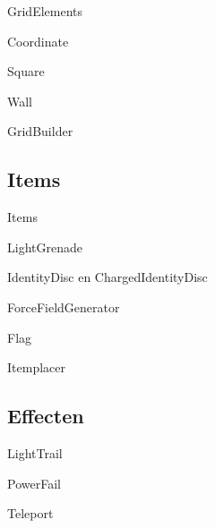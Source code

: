 \documentclass[11pt,t]{beamer}
\begin{document}
\begin{frame}{GridElements}
\end{frame}

\begin{frame}{Coordinate}
\end{frame}

\begin{frame}{Square}
\end{frame}

\begin{frame}{Wall}
\end{frame}

\begin{frame}{GridBuilder}
\end{frame}

\subsection{Items}

\begin{frame}{Items}
\end{frame}

\begin{frame}{LightGrenade}
\end{frame}

\begin{frame}{IdentityDisc en ChargedIdentityDisc}
\end{frame}

\begin{frame}{ForceFieldGenerator}
\end{frame}

\begin{frame}{Flag}
\end{frame}

\begin{frame}{Itemplacer}
\end{frame}

\subsection{Effecten}

\begin{frame}{LightTrail}
\end{frame}

\begin{frame}{PowerFail}
\end{frame}

\begin{frame}{Teleport}
\end{frame}
\end{document}
